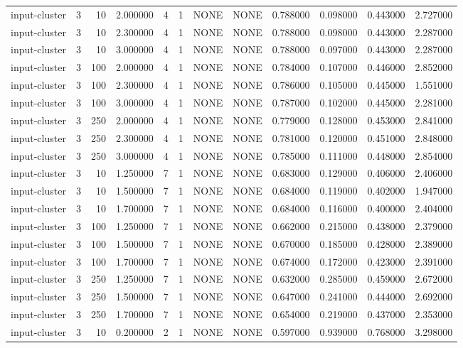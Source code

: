 \begin{tabular}{lrrrllllrrrr}
input-cluster & 3 & 10 & 2.000000 & 4 & 1 & NONE & NONE & 0.788000 & 0.098000 & 0.443000 & 2.727000 \\
input-cluster & 3 & 10 & 2.300000 & 4 & 1 & NONE & NONE & 0.788000 & 0.098000 & 0.443000 & 2.287000 \\
input-cluster & 3 & 10 & 3.000000 & 4 & 1 & NONE & NONE & 0.788000 & 0.097000 & 0.443000 & 2.287000 \\
input-cluster & 3 & 100 & 2.000000 & 4 & 1 & NONE & NONE & 0.784000 & 0.107000 & 0.446000 & 2.852000 \\
input-cluster & 3 & 100 & 2.300000 & 4 & 1 & NONE & NONE & 0.786000 & 0.105000 & 0.445000 & 1.551000 \\
input-cluster & 3 & 100 & 3.000000 & 4 & 1 & NONE & NONE & 0.787000 & 0.102000 & 0.445000 & 2.281000 \\
input-cluster & 3 & 250 & 2.000000 & 4 & 1 & NONE & NONE & 0.779000 & 0.128000 & 0.453000 & 2.841000 \\
input-cluster & 3 & 250 & 2.300000 & 4 & 1 & NONE & NONE & 0.781000 & 0.120000 & 0.451000 & 2.848000 \\
input-cluster & 3 & 250 & 3.000000 & 4 & 1 & NONE & NONE & 0.785000 & 0.111000 & 0.448000 & 2.854000 \\
input-cluster & 3 & 10 & 1.250000 & 7 & 1 & NONE & NONE & 0.683000 & 0.129000 & 0.406000 & 2.406000 \\
input-cluster & 3 & 10 & 1.500000 & 7 & 1 & NONE & NONE & 0.684000 & 0.119000 & 0.402000 & 1.947000 \\
input-cluster & 3 & 10 & 1.700000 & 7 & 1 & NONE & NONE & 0.684000 & 0.116000 & 0.400000 & 2.404000 \\
input-cluster & 3 & 100 & 1.250000 & 7 & 1 & NONE & NONE & 0.662000 & 0.215000 & 0.438000 & 2.379000 \\
input-cluster & 3 & 100 & 1.500000 & 7 & 1 & NONE & NONE & 0.670000 & 0.185000 & 0.428000 & 2.389000 \\
input-cluster & 3 & 100 & 1.700000 & 7 & 1 & NONE & NONE & 0.674000 & 0.172000 & 0.423000 & 2.391000 \\
input-cluster & 3 & 250 & 1.250000 & 7 & 1 & NONE & NONE & 0.632000 & 0.285000 & 0.459000 & 2.672000 \\
input-cluster & 3 & 250 & 1.500000 & 7 & 1 & NONE & NONE & 0.647000 & 0.241000 & 0.444000 & 2.692000 \\
input-cluster & 3 & 250 & 1.700000 & 7 & 1 & NONE & NONE & 0.654000 & 0.219000 & 0.437000 & 2.353000 \\
input-cluster & 3 & 10 & 0.200000 & 2 & 1 & NONE & NONE & 0.597000 & 0.939000 & 0.768000 & 3.298000 \\

\end{tabular}
